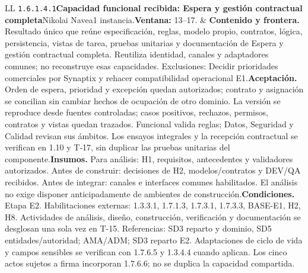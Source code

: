 \begin{longtable}{L{\tabcolsep\relax}L{\tabcolsep\relax}}
\texttt{1.\allowbreak{}6.\allowbreak{}1.\allowbreak{}4.\allowbreak{}1}\newline{}\textbf{Capacidad funcional recibida: Espera y gestión contractual completa}\newline{}Nikolai Navea\newline{}1 instancia.\newline{}\textbf{Ventana:} 13--17. & \textbf{Contenido y frontera.} Resultado único que reúne especificación, reglas, modelo propio, contratos, lógica, persistencia, vistas de tarea, pruebas unitarias y documentación de Espera y gestión contractual completa. Reutiliza identidad, canales y adaptadores comunes; no reconstruye esas capacidades. Exclusiones: Decidir prioridades comerciales por Synaptix y rehacer compatibilidad operacional E1.\newline{}\textbf{Aceptación.} Orden de espera, prioridad y excepción quedan autorizados; contrato y asignación se concilian sin cambiar hechos de ocupación de otro dominio. La versión se reproduce desde fuentes controladas; casos positivos, rechazos, permisos, contratos y vistas quedan trazados. Funcional valida reglas; Datos, Seguridad y Calidad revisan sus ámbitos. Los ensayos integrales y la recepción contractual se verifican en 1.10 y T-17, sin duplicar las pruebas unitarias del componente.\newline{}\textbf{Insumos.} Para análisis: H1, requisitos, antecedentes y validadores autorizados. Antes de construir: decisiones de H2, modelos/contratos y DEV/QA recibidos. Antes de integrar: canales e interfaces comunes habilitados. El análisis no exige disponer anticipadamente de ambientes de construcción.\newline{}\textbf{Condiciones.} Etapa E2. Habilitaciones externas: 1.3.3.1, 1.7.1.3, 1.7.3.1, 1.7.3.3, BASE-E1, H2, H8. Actividades de análisis, diseño, construcción, verificación y documentación se desglosan una sola vez en T-15. Referencias: SD3 reparto y dominio, SD5 entidades/autoridad; AMA/ADM; SD3 reparto E2. Adaptaciones de ciclo de vida y campos sensibles se verifican con 1.7.6.5 y 1.3.4.4 cuando aplican. Los cinco actos sujetos a firma incorporan 1.7.6.6; no se duplica la capacidad compartida.\\\hline

\end{longtable}
